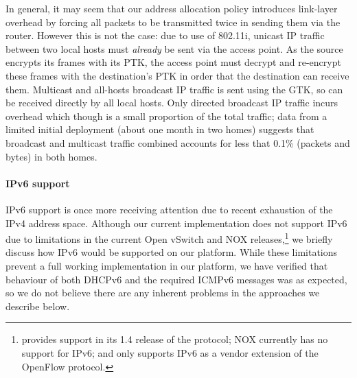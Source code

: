 In general, it may seem that our address allocation policy introduces link-layer
overhead by forcing all packets to be transmitted twice in sending them via the
router.  However this is not the case: due to use of 802.11i, unicast IP traffic
between two local hosts must \emph{already} be sent via the access point.  As
the source encrypts its frames with its PTK, the access point must decrypt and
re-encrypt these frames with the destination's PTK in order that the destination
can receive them.  Multicast and all-hosts broadcast IP traffic is sent using
the GTK, so can be received directly by all local hosts.  Only directed
broadcast IP traffic incurs overhead which though is a small proportion of the
total traffic; data from a limited initial deployment (about one month in two
homes) suggests that broadcast and multicast traffic combined accounts for less
that 0.1\% (packets and bytes) in both homes.


\paragraph{IPv6 support} 

IPv6 support is once more receiving attention due to recent exhaustion of the
IPv4 address space.  Although our current implementation does not support IPv6
due to limitations in the current Open vSwitch and NOX releases,\footnote{\of
  provides support in its 1.4 release of the protocol; NOX currently has no
  support for IPv6; and \ovs only supports IPv6 as a vendor extension of the
  OpenFlow protocol.} we briefly discuss how IPv6 would be supported on our
platform.  While these limitations prevent a full working implementation in our
platform, we have verified that behaviour of both DHCPv6 and the required ICMPv6
messages was as expected, so we do not believe there are any inherent problems
in the approaches we describe below.

